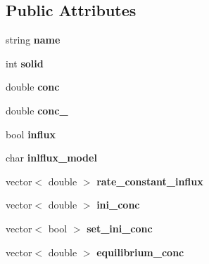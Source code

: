 \subsection*{Public Attributes}
\begin{DoxyCompactItemize}
\item 
\mbox{\label{class_c_constituent_a5e783aa8d11d68426b1efd801140d128}} 
string {\bfseries name}
\item 
\mbox{\label{class_c_constituent_a7a44ad414ce391f5be91b6c3d7c913fa}} 
int {\bfseries solid}
\item 
\mbox{\label{class_c_constituent_abfdaafcdf5c7e6654c6d1a0753e2bc26}} 
double {\bfseries conc}
\item 
\mbox{\label{class_c_constituent_a102ff8d6c3e402b3da70bff5362df005}} 
double {\bfseries conc\+\_}
\item 
\mbox{\label{class_c_constituent_a6e13b0d107108d50b076a0701238b647}} 
bool {\bfseries influx}
\item 
\mbox{\label{class_c_constituent_a438a53855216052878305cae7bdef552}} 
char {\bfseries inlflux\+\_\+model}
\item 
\mbox{\label{class_c_constituent_a49d30a249becaee9e2f356cb80f545d8}} 
vector$<$ double $>$ {\bfseries rate\+\_\+constant\+\_\+influx}
\item 
\mbox{\label{class_c_constituent_a28fc38d4e34050f46acf4f53d1e80298}} 
vector$<$ double $>$ {\bfseries ini\+\_\+conc}
\item 
\mbox{\label{class_c_constituent_a670c3c74a5ac2324f9049fc7997d8cb8}} 
vector$<$ bool $>$ {\bfseries set\+\_\+ini\+\_\+conc}
\item 
\mbox{\label{class_c_constituent_a2f1aa851886d49f7ffb4dc719a740d74}} 
vector$<$ double $>$ {\bfseries equilibrium\+\_\+conc}
\item 
\mbox{\label{class_c_constituent_a5d553680baf73cb04e0c04fcb640e619}} 

\end{DoxyCompactItemize}
